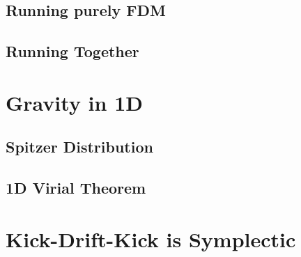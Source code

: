 \documentclass[oneside]{book}
\begin{document}
\section{Running purely FDM}

\section{Running Together}



\appendix
\chapter{Gravity in 1D}

\section{Spitzer Distribution}\label{Spitzer+BinneyTremaineProblem}

\section{1D Virial Theorem}\label{1D Virial Theorem}

\chapter{Kick-Drift-Kick is Symplectic}\label{KDK Symplectic}


\end{document}
